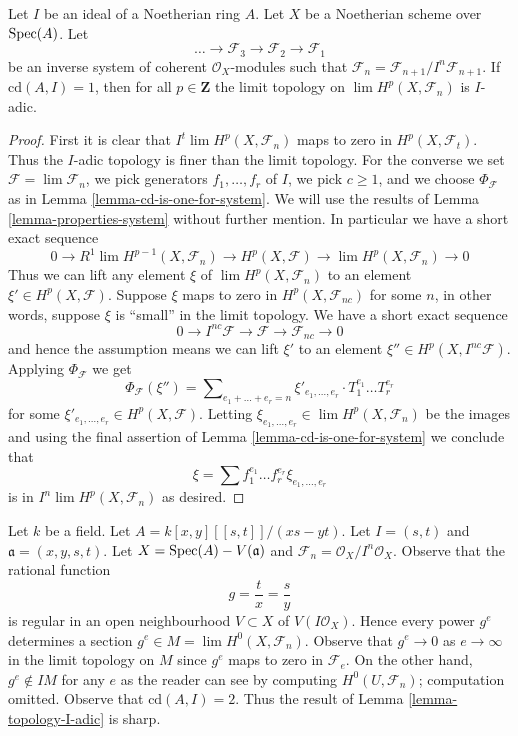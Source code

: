 \begin{lemma}
\label{lemma-topology-I-adic}
Let $I$ be an ideal of a Noetherian ring $A$. Let $X$ be a Noetherian scheme
over $\mathop{\mathrm{Spec}}(A)$. Let
$$
\ldots \to \mathcal{F}_3 \to \mathcal{F}_2 \to \mathcal{F}_1
$$
be an inverse system of coherent $\mathcal{O}_X$-modules
such that $\mathcal{F}_n = \mathcal{F}_{n + 1}/I^n\mathcal{F}_{n + 1}$.
If $\text{cd}(A, I) = 1$, then for all $p \in \mathbf{Z}$ the limit topology on
$\lim H^p(X, \mathcal{F}_n)$ is $I$-adic.
\end{lemma}

\begin{proof}
First it is clear that $I^t \lim H^p(X, \mathcal{F}_n)$
maps to zero in $H^p(X, \mathcal{F}_t)$. Thus the $I$-adic topology
is finer than the limit topology. For the converse we set
$\mathcal{F} = \lim \mathcal{F}_n$, we pick generators $f_1, \ldots, f_r$
of $I$, we pick $c \geq 1$, and we choose
$\Phi_\mathcal{F}$ as in Lemma \ref{lemma-cd-is-one-for-system}.
We will use the results of Lemma \ref{lemma-properties-system}
without further mention. In particular we have a short exact
sequence
$$
0 \to R^1\lim H^{p - 1}(X, \mathcal{F}_n) \to H^p(X, \mathcal{F})
\to \lim H^p(X, \mathcal{F}_n) \to 0
$$
Thus we can lift any element $\xi$ of $\lim H^p(X, \mathcal{F}_n)$
to an element $\xi' \in H^p(X, \mathcal{F})$. Suppose $\xi$ maps to zero
in $H^p(X, \mathcal{F}_{nc})$ for some $n$, in other
words, suppose $\xi$ is ``small'' in the limit topology. We have a
short exact sequence
$$
0 \to I^{nc}\mathcal{F} \to \mathcal{F} \to \mathcal{F}_{nc} \to 0
$$
and hence the assumption means we can lift $\xi'$ to an element
$\xi'' \in H^p(X, I^{nc}\mathcal{F})$. Applying $\Phi_\mathcal{F}$
we get
$$
\Phi_\mathcal{F}(\xi'') = \sum\nolimits_{e_1 + \ldots + e_r = n}
\xi'_{e_1, \ldots, e_r} \cdot T_1^{e_1} \ldots T_r^{e_r}
$$
for some $\xi'_{e_1, \ldots, e_r} \in H^p(X, \mathcal{F})$.
Letting $\xi_{e_1, \ldots, e_r} \in \lim H^p(X, \mathcal{F}_n)$
be the images and using the final assertion of
Lemma \ref{lemma-cd-is-one-for-system}
we conclude that
$$
\xi = \sum f_1^{e_1} \ldots f_r^{e_r} \xi_{e_1, \ldots, e_r}
$$
is in $I^n \lim H^p(X, \mathcal{F}_n)$ as desired.
\end{proof}

\begin{example}
\label{example-not-I-adic}
Let $k$ be a field. Let $A = k[x, y][[s, t]]/(xs - yt)$.
Let $I = (s, t)$ and $\mathfrak a = (x, y, s, t)$.
Let $X = \mathop{\mathrm{Spec}}(A) - V(\mathfrak a)$ and
$\mathcal{F}_n = \mathcal{O}_X/I^n\mathcal{O}_X$.
Observe that the rational function
$$
g = \frac{t}{x} = \frac{s}{y}
$$
is regular in an open neighbourhood $V \subset X$ of
$V(I\mathcal{O}_X)$. Hence every power $g^e$ determines a section
$g^e \in M = \lim H^0(X, \mathcal{F}_n)$. Observe that
$g^e \to 0$ as $e \to \infty$ in the limit topology on $M$
since $g^e$ maps to zero in $\mathcal{F}_e$.
On the other hand, $g^e \not \in IM$ for any $e$
as the reader can see by computing $H^0(U, \mathcal{F}_n)$;
computation omitted. Observe that $\text{cd}(A, I) = 2$.
Thus the result of Lemma \ref{lemma-topology-I-adic} is sharp.
\end{example}








